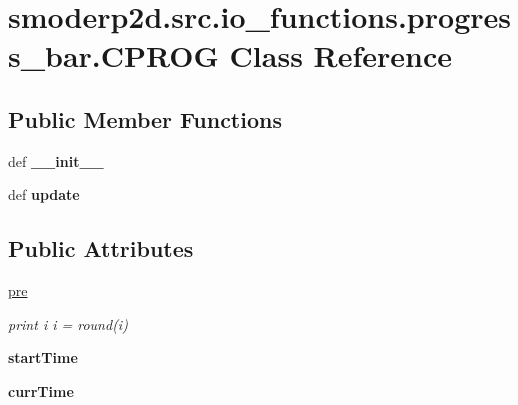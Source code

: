 \hypertarget{classsmoderp2d_1_1src_1_1io__functions_1_1progress__bar_1_1CPROG}{\section{smoderp2d.\-src.\-io\-\_\-functions.\-progress\-\_\-bar.\-C\-P\-R\-O\-G Class Reference}
\label{classsmoderp2d_1_1src_1_1io__functions_1_1progress__bar_1_1CPROG}
}
\subsection*{Public Member Functions}
\begin{DoxyCompactItemize}
\item 
\hypertarget{classsmoderp2d_1_1src_1_1io__functions_1_1progress__bar_1_1CPROG_ab17498ec58d6a6a8da846fe178dda15a}{def {\bfseries \-\_\-\-\_\-init\-\_\-\-\_\-}}\label{classsmoderp2d_1_1src_1_1io__functions_1_1progress__bar_1_1CPROG_ab17498ec58d6a6a8da846fe178dda15a}

\item 
\hypertarget{classsmoderp2d_1_1src_1_1io__functions_1_1progress__bar_1_1CPROG_aed7dbe1604e19325619d67dece13f994}{def {\bfseries update}}\label{classsmoderp2d_1_1src_1_1io__functions_1_1progress__bar_1_1CPROG_aed7dbe1604e19325619d67dece13f994}

\end{DoxyCompactItemize}
\subsection*{Public Attributes}
\begin{DoxyCompactItemize}
\item 
\hypertarget{classsmoderp2d_1_1src_1_1io__functions_1_1progress__bar_1_1CPROG_af8242685ed25599ff6320b17d7ecc97f}{\hyperlink{classsmoderp2d_1_1src_1_1io__functions_1_1progress__bar_1_1CPROG_af8242685ed25599ff6320b17d7ecc97f}{pre}}\label{classsmoderp2d_1_1src_1_1io__functions_1_1progress__bar_1_1CPROG_af8242685ed25599ff6320b17d7ecc97f}

\begin{DoxyCompactList}\small\item\em print i i = round(i) \end{DoxyCompactList}\item 
\hypertarget{classsmoderp2d_1_1src_1_1io__functions_1_1progress__bar_1_1CPROG_ae43bff15d5e6b6571009fc2459e7d9a4}{{\bfseries start\-Time}}\label{classsmoderp2d_1_1src_1_1io__functions_1_1progress__bar_1_1CPROG_ae43bff15d5e6b6571009fc2459e7d9a4}

\item 
\hypertarget{classsmoderp2d_1_1src_1_1io__functions_1_1progress__bar_1_1CPROG_aa437f963e707b59285914615876cd745}{{\bfseries curr\-Time}}\label{classsmoderp2d_1_1src_1_1io__functions_1_1progress__bar_1_1CPROG_aa437f963e707b59285914615876cd745}

\end{DoxyCompactItemize}


